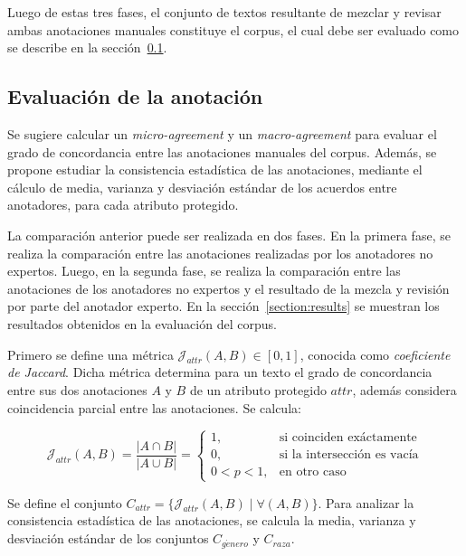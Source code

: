 Luego de estas tres fases, el conjunto de textos resultante de mezclar y revisar ambas anotaciones manuales constituye el corpus, el 
cual debe ser evaluado como se describe en la secci\'on~\ref{subsection:annotation_evaluation}.

\subsection{Evaluaci\'on de la anotaci\'on}\label{subsection:annotation_evaluation}
Se sugiere calcular un \emph{micro-agreement} y un \emph{macro-agreement} para evaluar el grado de concordancia entre las anotaciones
manuales del corpus. Adem\'as, se propone estudiar la consistencia estad\'istica de las anotaciones, mediante el c\'alculo  
de media, varianza y desviaci\'on est\'andar de los acuerdos entre anotadores, para cada atributo protegido.

La comparaci\'on anterior puede ser realizada en dos fases. En la primera fase, se realiza la comparaci\'on entre las anotaciones 
realizadas por los anotadores no expertos. Luego, en la segunda fase, se realiza la comparaci\'on entre las anotaciones de los 
anotadores no expertos y el resultado de la mezcla y revisi\'on por parte del anotador experto. En la secci\'on~\ref{section:results} 
se muestran los resultados obtenidos en la evaluaci\'on del corpus.

Primero se define una m\'etrica $\mathcal{J}_{attr}(A, B) \in [0,1]$, conocida como \emph{coeficiente de Jaccard}. Dicha m\'etrica 
determina para un texto el grado de concordancia entre sus dos anotaciones $A$ y $B$ de un atributo protegido $attr$, adem\'as 
considera coincidencia parcial entre las anotaciones. Se calcula:

\begin{equation*}
    \mathcal{J}_{attr}(A, B) = \frac{|A \cap B|}{|A \cup B|} = \begin{cases}
        1, & \text{si coinciden ex\'actamente} \\
        0, & \text{si la intersecci\'on es vac\'ia} \\
        0 < p < 1, & \text{en otro caso}
    \end{cases}
\end{equation*}

Se define el conjunto $C_{attr} = \{\mathcal{J}_{attr}(A, B) \mid \forall (A, B)\}$. Para analizar la consistencia estad\'istica 
de las anotaciones, se calcula la media, varianza y desviaci\'on est\'andar de los conjuntos $C_{g\acute{e}nero}$ y $C_{raza}$.

